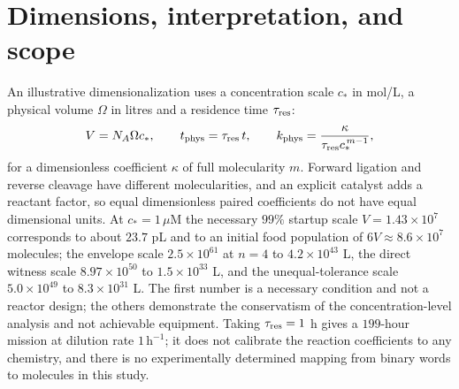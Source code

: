 \documentclass[11pt,letterpaper]{article}
\theoremstyle{plain}
\theoremstyle{definition}
\theoremstyle{remark}
\numberwithin{equation}{section}
\begin{document}
\section{Dimensions, interpretation, and scope}\label{sec:units}

An illustrative dimensionalization uses a concentration scale $c_*$ in mol/L, a physical volume $\Omega$ in litres and a residence time $\tau_{\rm res}$:
\begin{equation}\label{eq:dimensions}
 V=N_A\Omega c_*,\qquad t_{\rm phys}=\tau_{\rm res}\,t,\qquad k_{\rm phys}=\frac\kappa{\tau_{\rm res}c_*^{\,m-1}},
\end{equation}
for a dimensionless coefficient $\kappa$ of full molecularity $m$. Forward ligation and reverse cleavage have different molecularities, and an explicit catalyst adds a reactant factor, so equal dimensionless paired coefficients do not have equal dimensional units. At $c_*=1\,\mu$M the necessary $99\%$ startup scale $V=1.43\times10^7$ corresponds to about $23.7$ pL and to an initial food population of $6V\approx8.6\times10^7$ molecules; the envelope scale $2.5\times10^{61}$ at $n=4$ to $4.2\times10^{43}$ L, the direct witness scale $8.97\times10^{50}$ to $1.5\times10^{33}$ L, and the unequal-tolerance scale $5.0\times10^{49}$ to $8.3\times10^{31}$ L. The first number is a necessary condition and not a reactor design; the others demonstrate the conservatism of the concentration-level analysis and not achievable equipment. Taking $\tau_{\rm res}=1$ h gives a $199$-hour mission at dilution rate $1\,\mathrm h^{-1}$; it does not calibrate the reaction coefficients to any chemistry, and there is no experimentally determined mapping from binary words to molecules in this study.
\end{document}
